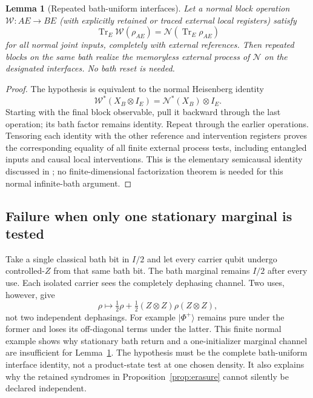 \documentclass[11pt]{article}
\newtheorem{lemma}[theorem]{Lemma}
\newcommand{\Tr}{\operatorname{Tr}}
\newcommand{\ket}[1]{\lvert #1\rangle}
\begin{document}
\begin{lemma}[Repeated bath-uniform interfaces]\label{lem:compose}
Let a normal block operation $\mathcal W:AE\to BE$ (with explicitly retained or traced external local registers) satisfy
\[
 \Tr_E\mathcal W(\rho_{AE})=\mathcal N(\Tr_E\rho_{AE})
\]
for all normal joint inputs, completely with external references. Then repeated blocks on the same bath realize the memoryless external process of $\mathcal N$ on the designated interfaces. No bath reset is needed.
\end{lemma}
\begin{proof}
The hypothesis is equivalent to the normal Heisenberg identity
\[
 \mathcal W^*(X_B\otimes I_E)=\mathcal N^*(X_B)\otimes I_E.
\]
Starting with the final block observable, pull it backward through the last operation; its bath factor remains identity. Repeat through the earlier operations. Tensoring each identity with the other reference and intervention registers proves the corresponding equality of all finite external process tests, including entangled inputs and causal local interventions. This is the elementary semicausal identity discussed in \cite{ESW}; no finite-dimensional factorization theorem is needed for this normal infinite-bath argument.
\end{proof}

\subsection{Failure when only one stationary marginal is tested}

Take a single classical bath bit in $I/2$ and let every carrier qubit undergo controlled-$Z$ from that same bath bit. The bath marginal remains $I/2$ after every use. Each isolated carrier sees the completely dephasing channel. Two uses, however, give
\[
 \rho\longmapsto\tfrac12\rho+\tfrac12(Z\otimes Z)\rho(Z\otimes Z),
\]
not two independent dephasings. For example $\ket{\Phi^+}$ remains pure under the former and loses its off-diagonal terms under the latter. This finite normal example shows why stationary bath return and a one-initializer marginal channel are insufficient for Lemma~\ref{lem:compose}. The hypothesis must be the complete bath-uniform interface identity, not a product-state test at one chosen density. It also explains why the retained syndromes in Proposition~\ref{prop:erasure} cannot silently be declared independent.


\end{document}
